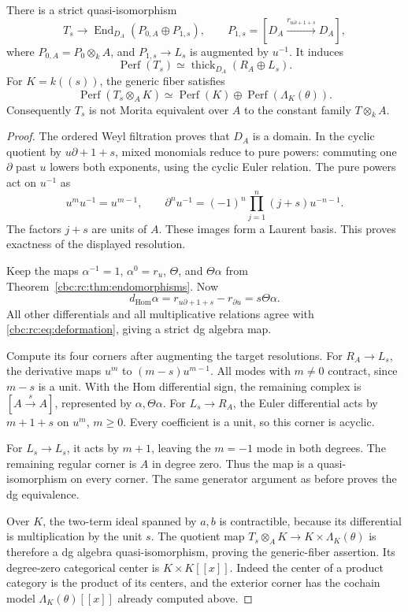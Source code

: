 \begin{theorem}\label{cbc:rc:thm:kummer}
There is a strict quasi-isomorphism
\[
 T_s\longrightarrow
 \operatorname{End}_{D_A}(P_{0,A}\oplus P_{1,s}),\qquad
 P_{1,s}=[D_A\xrightarrow{r_{u\partial+1+s}}D_A],
\]
where \(P_{0,A}=P_0\otimes_k A\), and \(P_{1,s}\to L_s\) is augmented
by \(u^{-1}\).  It induces
\[
 \operatorname{Perf}(T_s)\simeq
 \operatorname{thick}_{D_A}(R_A\oplus L_s).
\]
For \(K=k((s))\), the generic fiber satisfies
\[
 \operatorname{Perf}(T_s\otimes_A K)\simeq
 \operatorname{Perf}(K)\oplus\operatorname{Perf}(\Lambda_K(\theta)).
\]
Consequently \(T_s\) is not Morita equivalent over \(A\) to the
constant family \(T\otimes_k A\).
\end{theorem}
\begin{proof}
The ordered Weyl filtration proves that \(D_A\) is a domain.
In the cyclic quotient by \(u\partial+1+s\), mixed monomials reduce
to pure powers: commuting one \(\partial\) past \(u\) lowers both
exponents, using the cyclic Euler relation.
The pure powers act on \(u^{-1}\) as
\[
 u^m u^{-1}=u^{m-1},\qquad
 \partial^n u^{-1}=(-1)^n\prod_{j=1}^n(j+s)u^{-n-1}.
\]
The factors \(j+s\) are units of \(A\). These images form a Laurent
basis.  This proves exactness of the displayed resolution.

Keep the maps \(\alpha^{-1}=1\), \(\alpha^0=r_u\), \(\Theta\), and \(\Theta\alpha\)
from Theorem~\ref{cbc:rc:thm:endomorphisms}.  Now
\[
 d_{\operatorname{Hom}}\alpha
   =r_{u\partial+1+s}-r_{\partial u}=s\Theta\alpha.
\]
All other differentials and all multiplicative relations agree with
\eqref{cbc:rc:eq:deformation}, giving a strict dg algebra map.

Compute its four corners after augmenting the target resolutions.
For \(R_A\to L_s\), the derivative maps
\(u^m\) to \((m-s)u^{m-1}\).  All modes with \(m\ne0\) contract,
since \(m-s\) is a unit.  With the Hom differential sign, the remaining
complex is \([A\xrightarrow{s}A]\), represented by \(\alpha,\Theta\alpha\).
For \(L_s\to R_A\), the Euler differential acts by \(m+1+s\) on
\(u^m\), \(m\geq0\). Every coefficient is a unit, so this corner is
acyclic.

For \(L_s\to L_s\), it acts by \(m+1\), leaving the
\(m=-1\) mode in both degrees.  The remaining regular corner is \(A\)
in degree zero.  Thus the map is a quasi-isomorphism on every corner.
The same generator argument as before proves the dg equivalence.

Over \(K\), the two-term ideal spanned by \(a,b\) is contractible,
because its differential is multiplication by the unit \(s\).
The quotient map
\(T_s\otimes_A K\to K\times\Lambda_K(\theta)\) is therefore a
dg algebra quasi-isomorphism, proving the generic-fiber assertion.
Its degree-zero categorical center is \(K\times K[[x]]\).
Indeed the center of a product category is the product of its
centers, and the exterior corner has the cochain model
\(\Lambda_K(\theta)[[x]]\) already computed above.


\end{proof}
